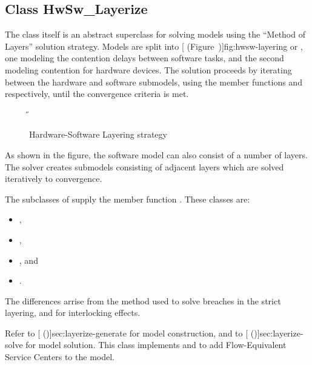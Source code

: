 \htmlrule
\subsection{Class HwSw_Layerize}
\label{sec:hwsw}

The class  itself is an abstract superclass for
solving models using the ``Method of Layers'' solution strategy.
Models are split into [
(Figure~\Ref)]{fig:hwsw-layering} or , one modeling
the contention delays between software tasks, and the second modeling
contention for hardware devices.  The solution proceeds by iterating
between the hardware and software submodels, using the member
functions  and
 respectively,
until the convergence criteria is met.

\begin{figure}[p]
  \label{fig:hwsw-layering}
  \begin{center}
    \T \tex \leavevmode 
    \caption{Hardware-Software Layering strategy}
    \H {}
  \end{center}
\end{figure}

As shown in the figure, the software model can also consist of a
number of layers.  The solver creates submodels consisting of adjacent
layers which are solved iteratively to convergence.

The subclasses of  supply the member function
.  These classes are:
\begin{itemize}
\item {},
\item {},
\item {}, and
\item {}.
\end{itemize}
The differences arrise from the method used to solve breaches in the
strict layering, and for interlocking effects.

Refer to [ (\Sec\Ref)]{sec:layerize-generate}
for model construction, and to [
(\Sec\Ref)]{sec:layerize-solve} for model solution.  This class
implements  and  to add
Flow-Equivalent Service Centers to the model.

